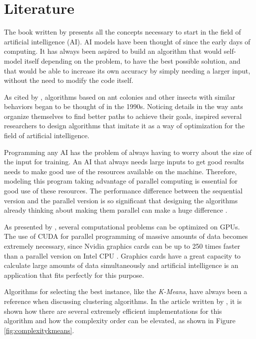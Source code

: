 \section{Literature}

The book written by \citeauthor{BookIA} \cite{BookIA} presents all the concepts necessary to start in the field of artificial intelligence (AI).
AI models have been thought of since the early days of computing. It has always been aspired to build an algorithm
that would self-model itself depending on the problem, to have the best possible solution,
and that would be able to increase its own accuracy by simply needing a larger input, without the need to modify
the code itself.

As cited by \citeauthor{AntColonyOptimization} \cite{AntColonyOptimization}, algorithms based on ant colonies
and other insects with similar behaviors began to be thought of in the 1990s.
Noticing details in the way ants organize themselves to find better
paths to achieve their goals, inspired several researchers to design algorithms that imitate it as a way
of optimization for the field of artificial intelligence.

Programming any AI has the problem of always having to worry about the size of the input for training.
An AI that always needs large inputs to get good results needs to make good use of the resources available on the machine.
Therefore, modeling this program taking advantage of parallel computing is essential for good use of these resources.
The performance difference between the sequential version and the parallel version is so significant that designing the algorithms
already thinking about making them parallel can make a huge difference \cite{SequentialVSParallel}.

As presented by \citeauthor{ParallelComputingCUDA}, several computational problems can be optimized on GPUs.
The use of CUDA for parallel programming of massive amounts of data becomes extremely necessary, since
Nvidia graphics cards can be up to 250 times faster than a parallel version on Intel CPU \cite{ParallelComputingCUDA}.
Graphics cards have a great capacity to calculate large amounts of data simultaneously and artificial intelligence
is an application that fits perfectly for this purpose.

Algorithms for selecting the best instance, like the \emph{K-Means}, have always been a reference when discussing clustering algorithms. In the article written by \citeauthor{KmeansAlgorithm} \cite{KmeansAlgorithm}, it is shown how there are several extremely efficient implementations for this algorithm and how the complexity order can be elevated, as shown in Figure \ref{fig:complexitykmeans}.

